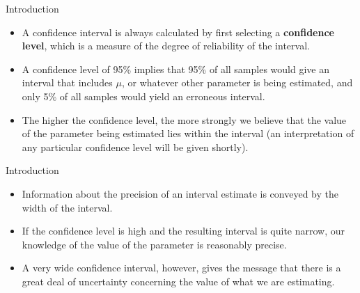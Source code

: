 \documentclass[
  ignorenonframetext,
]{beamer}
\providecommand{\tightlist}{%
  \setlength{\itemsep}{0pt}\setlength{\parskip}{0pt}}\usepackage{longtable,booktabs,array}
\begin{document}
\begin{frame}{Introduction}
\protect\hypertarget{introduction-1}{}
\begin{itemize}[<+->]
\tightlist
\item
  A confidence interval is always calculated by first selecting a
  \textbf{confidence level}, which is a measure of the degree of
  reliability of the interval.
\item
  A confidence level of 95\% implies that 95\% of all samples would give
  an interval that includes \(\mu\), or whatever other parameter is
  being estimated, and only 5\% of all samples would yield an erroneous
  interval.
\item
  The higher the confidence level, the more strongly we believe that the
  value of the parameter being estimated lies within the interval (an
  interpretation of any particular confidence level will be given
  shortly).
\end{itemize}
\end{frame}

\begin{frame}{Introduction}
\protect\hypertarget{introduction-2}{}
\begin{itemize}[<+->]
\tightlist
\item
  Information about the precision of an interval estimate is conveyed by
  the width of the interval.
\item
  If the confidence level is high and the resulting interval is quite
  narrow, our knowledge of the value of the parameter is reasonably
  precise.
\item
  A very wide confidence interval, however, gives the message that there
  is a great deal of uncertainty concerning the value of what we are
  estimating.
\end{itemize}
\end{frame}
\end{document}
